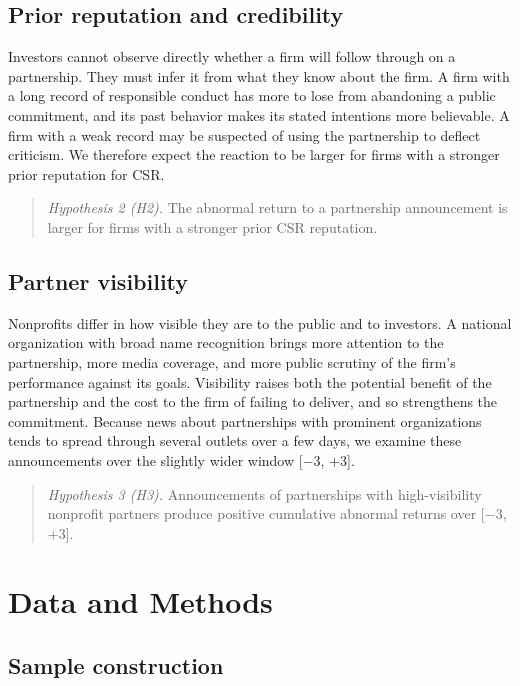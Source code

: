 \documentclass[11pt]{article}
\newcommand{\win}[2]{[$#1$, $#2$]}
\begin{document}
\subsection{Prior reputation and credibility}

Investors cannot observe directly whether a firm will follow through on a partnership. They must infer it from what they know about the firm. A firm with a long record of responsible conduct has more to lose from abandoning a public commitment, and its past behavior makes its stated intentions more believable. A firm with a weak record may be suspected of using the partnership to deflect criticism. We therefore expect the reaction to be larger for firms with a stronger prior reputation for CSR.

\begin{quote}
\textit{Hypothesis 2 (H2).} The abnormal return to a partnership announcement is larger for firms with a stronger prior CSR reputation.
\end{quote}

\subsection{Partner visibility}

Nonprofits differ in how visible they are to the public and to investors. A national organization with broad name recognition brings more attention to the partnership, more media coverage, and more public scrutiny of the firm's performance against its goals. Visibility raises both the potential benefit of the partnership and the cost to the firm of failing to deliver, and so strengthens the commitment. Because news about partnerships with prominent organizations tends to spread through several outlets over a few days, we examine these announcements over the slightly wider window \win{-3}{+3}.

\begin{quote}
\textit{Hypothesis 3 (H3).} Announcements of partnerships with high-visibility nonprofit partners produce positive cumulative abnormal returns over \win{-3}{+3}.
\end{quote}

\section{Data and Methods}

\subsection{Sample construction}
\end{document}
